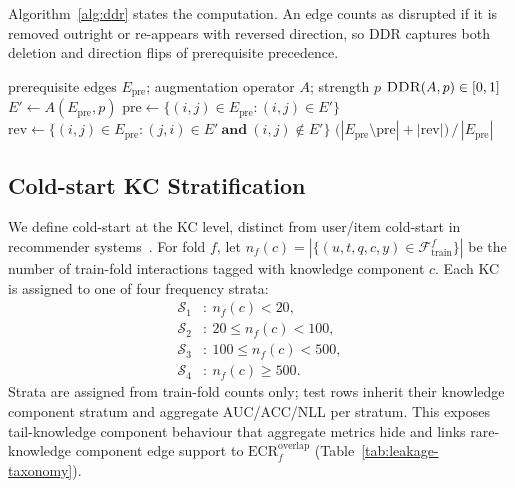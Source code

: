 \documentclass[pdflatex,sn-mathphys-num]{sn-jnl}
\newcommand{\Epre}{\ensuremath{E_{\text{pre}}}}
\newcommand{\KC}{knowledge component}
\newcommand{\DDR}{\textsc{DDR}}
\newcommand{\rev}[1]{\hl{#1}}
\newcommand{\rev}[1]{#1}
\newenvironment{revbox}{}{}
\begin{document}
\begin{revbox}
Algorithm~\ref{alg:ddr} states the computation. An edge counts as disrupted if
it is removed outright or re-appears with reversed direction, so \DDR{}
captures both deletion and direction flips of prerequisite precedence.
\end{revbox}

\begin{algorithm}[t]
\caption{\rev{DAG Disruption Rate (\DDR{})}}
\label{alg:ddr}
\begin{algorithmic}[1]
\Require prerequisite edges $\Epre$; augmentation operator $A$; strength $p$
\Ensure $\DDR(A,p)\in[0,1]$
\State $E' \gets A(\Epre, p)$ 
\State $\mathrm{pre} \gets \{(i,j)\in\Epre : (i,j)\in E'\}$ 
\State $\mathrm{rev} \gets \{(i,j)\in\Epre : (j,i)\in E'\ \textbf{and}\ (i,j)\notin E'\}$ 
\State \Return $\big(|\Epre\setminus\mathrm{pre}| + |\mathrm{rev}|\big)\,/\,|\Epre|$
\end{algorithmic}
\end{algorithm}

\subsection{Cold-start KC Stratification}
\label{sec:cold-start}
We define cold-start at the KC level, distinct from user/item
cold-start in recommender systems~\cite{schein2002coldstart}. For fold
$f$, let $n_f(c)=|\{(u,t,q,c,y)\in\mathcal{F}_{\text{train}}^f\}|$ be
the number of train-fold interactions tagged with \KC{} $c$. Each KC
is assigned to one of four frequency strata:
\[
\begin{aligned}
\mathcal{S}_1&:\ n_f(c)<20,\\
\mathcal{S}_2&:\ 20\le n_f(c)<100,\\
\mathcal{S}_3&:\ 100\le n_f(c)<500,\\
\mathcal{S}_4&:\ n_f(c)\ge 500.
\end{aligned}
\]
Strata are assigned from train-fold counts only; test rows inherit their
\KC{} stratum and aggregate AUC/ACC/NLL per stratum. This exposes tail-\KC{}
behaviour that aggregate metrics hide and links rare-\KC{} edge support to
$\mathrm{ECR}^{\mathrm{overlap}}_f$ (Table~\ref{tab:leakage-taxonomy}).
\end{document}
